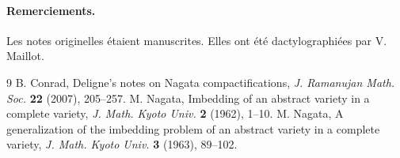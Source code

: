 \documentclass[11pt]{article}
\begin{document}
\paragraph{Remerciements.}
Les notes originelles étaient manuscrites. Elles ont été dactylographiées par V. Maillot.

\begin{thebibliography}{9}
 B. Conrad, Deligne's notes on Nagata compactifications, \emph{J. Ramanujan Math. Soc.} \textbf{22} (2007), 205--257.
 M. Nagata, Imbedding of an abstract variety in a complete variety, \emph{J. Math. Kyoto Univ.} \textbf{2} (1962), 1--10.
 M. Nagata, A generalization of the imbedding problem of an abstract variety in a complete variety, \emph{J. Math. Kyoto Univ.} \textbf{3} (1963), 89--102.
\end{thebibliography}
\end{document}
